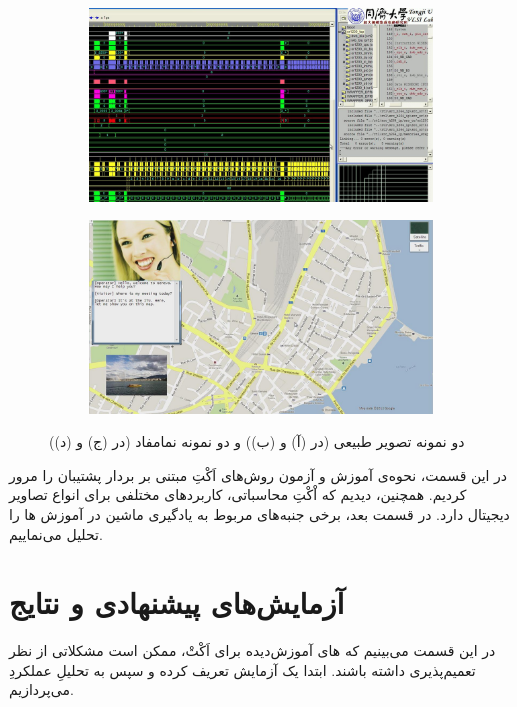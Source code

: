 \documentclass[twocolumn]{article}
\begin{document}
\begin{figure}
	\hfill
	\begin{subfigure}{0.24\textwidth}
		\includegraphics[width=\textwidth]{SCI30.jpg}
		\caption{}
		\label{fig:sci_1}
	\end{subfigure}
	\hfill
	\begin{subfigure}{0.24\textwidth}
		\includegraphics[width=\textwidth]{SCI33.jpg}
		\caption{}
		\label{fig:sci_2}
	\end{subfigure}
	\caption{دو نمونه تصویر طبیعی (در (آ) و (ب)) و دو نمونه نمامفاد (در (ج) و (د))}
	\label{fig:nsi_sci}
\end{figure}


در این قسمت، نحوه‌ی آموزش و آزمون روش‌های اَکْتِ مبتنی بر بردار پشتیبان را مرور کردیم. همچنین، دیدیم که اْکْتِ محاسباتی، کاربردهای مختلفی برای انواع تصاویر دیجیتال دارد. در قسمت بعد، برخی جنبه‌های مربوط به یادگیری ماشین در آموزش ها را تحلیل می‌نماییم.
\section{آزمایش‌های پیشنهادی و نتایج} \label{sec:experiments}
در این قسمت می‌بینیم که های آموزش‌دیده برای اَکْتْ، ممکن است مشکلاتی از نظر تعمیم‌پذیری داشته باشند. ابتدا یک آزمایش تعریف کرده و سپس به تحلیلِ عملکردِ  می‌پردازیم.
\end{document}
